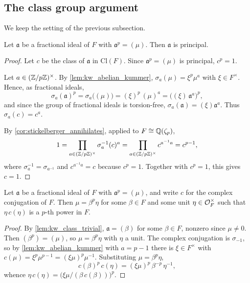 \subsection{The class group argument}

We keep the setting of the previous subsection.

\begin{lemma}
  \label{lem:kw_class_trivial}
  \leanok
  Let $\mathfrak{a}$ be a fractional ideal of $F$ with $\mathfrak{a}^p = (\mu)$. Then
  $\mathfrak{a}$ is principal.
\end{lemma}

\begin{proof}
  \leanok
  Let $c$ be the class of $\mathfrak{a}$ in $\mathrm{Cl}(F)$. Since $\mathfrak{a}^p = (\mu)$ is
  principal, $c^p = 1$.

  Let $a \in (\mathbb{Z}/p\mathbb{Z})^\times$. By \ref{lem:kw_abelian_kummer}, $\sigma_a(\mu) = \xi^p\mu^a$ with
  $\xi \in F^\times$. Hence, as fractional ideals,
  \[
    \sigma_a(\mathfrak{a})^p = \sigma_a\big((\mu)\big) = (\xi)^p\,(\mu)^a = \big((\xi)\,
    \mathfrak{a}^a\big)^p,
  \]
  and since the group of fractional ideals is torsion-free, $\sigma_a(\mathfrak{a}) =
  (\xi)\mathfrak{a}^a$. Thus $\sigma_a(c) = c^a$.

  By \ref{cor:stickelberger_annihilates}, applied to $F \cong \mathbb{Q}(\zeta_p)$,
  \[
    1 = \prod_{a \in (\mathbb{Z}/p\mathbb{Z})^\times} \sigma_a^{-1}(c)^a
      = \prod_{a \in (\mathbb{Z}/p\mathbb{Z})^\times} c^{a^{-1}a} = c^{p-1},
  \]
  where $\sigma_a^{-1} = \sigma_{a^{-1}}$ and $c^{a^{-1}a} = c$ because $c^p = 1$. Together with
  $c^p = 1$, this gives $c = 1$.
\end{proof}

\begin{lemma}
  \label{lem:kw_unit_conj_pow}
  \leanok
  Let $\mathfrak{a}$ be a fractional ideal of $F$ with $\mathfrak{a}^p = (\mu)$, and write $c$ for
  the complex conjugation of $F$. Then $\mu = \beta^p\eta$ for some $\beta \in F$ and some unit
  $\eta \in \mathcal{O}_F^\times$ such that $\eta\,c(\eta)$ is a $p$-th power in $F$.
\end{lemma}

\begin{proof}
  \leanok
  By \ref{lem:kw_class_trivial}, $\mathfrak{a} = (\beta)$ for some $\beta \in F$, nonzero since
  $\mu \neq 0$. Then $(\beta^p) = (\mu)$, so $\mu = \beta^p\eta$ with $\eta$ a unit. The complex
  conjugation is $\sigma_{-1}$, so by \ref{lem:kw_abelian_kummer} with $a = p - 1$ there is
  $\xi \in F^\times$ with $c(\mu) = \xi^p\mu^{p-1} = (\xi\mu)^p\mu^{-1}$. Substituting
  $\mu = \beta^p\eta$,
  \[
    c(\beta)^p\,c(\eta) = (\xi\mu)^p\,\beta^{-p}\,\eta^{-1},
  \]
  whence $\eta\,c(\eta) = \big(\xi\mu/(\beta\,c(\beta))\big)^p$.
\end{proof}

